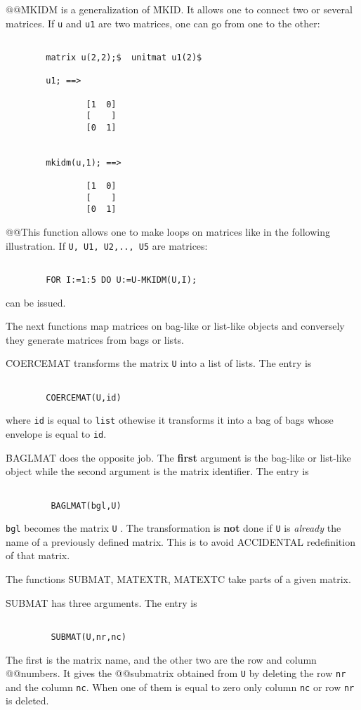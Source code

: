 @@\f{MKIDM} is a generalization of \f{MKID}. It allows one to connect
two or several matrices. If \verb+u+ and \verb+u1+ are two matrices,
one can go from one to the other:
\begin{verbatim}

        matrix u(2,2);$  unitmat u1(2)$

        u1; ==>

                [1  0]
                [    ]
                [0  1]


        mkidm(u,1); ==>

                [1  0]
                [    ]
                [0  1]

\end{verbatim}
@@This function allows one to make loops on matrices like in the following
illustration. If \verb+U, U1, U2,.., U5+ are matrices:
\begin{verbatim}

        FOR I:=1:5 DO U:=U-MKIDM(U,I);

\end{verbatim}
can be issued.
\item[ii.]
The next functions map matrices on bag-like or list-like objects
and conversely  they generate matrices from bags or lists.

\f{COERCEMAT} transforms the matrix \verb+U+ into a list of lists.
The entry is
\begin{verbatim}

        COERCEMAT(U,id)

\end{verbatim}
where \verb+id+ is equal to \verb+list+ othewise it transforms it into
a bag of bags whose envelope is equal to \verb+id+.

\f{BAGLMAT} does the opposite job. The {\bf first} argument is the
bag-like or list-like object while the second argument is the matrix
identifier. The entry is
\begin{verbatim}

         BAGLMAT(bgl,U)

\end{verbatim}
\verb+bgl+ becomes the matrix \verb+U+ . The transformation is
{\bf not} done if \verb+U+  is {\em already} the  name of a
previously  defined matrix. This is to avoid ACCIDENTAL redefinition
of that matrix.
\item[ii.]
The functions \f{SUBMAT, MATEXTR, MATEXTC} take parts of a given matrix.

\f{SUBMAT} has three arguments. The entry is
\begin{verbatim}

         SUBMAT(U,nr,nc)

\end{verbatim}
The first is the matrix name, and the other two are the row  and column
@@numbers.  It gives the
@@submatrix obtained from \verb+U+ by deleting the row \verb+nr+ and
the column \verb+nc+.
When one of them is equal to zero only column \verb+nc+
or row \verb+nr+ is deleted.

